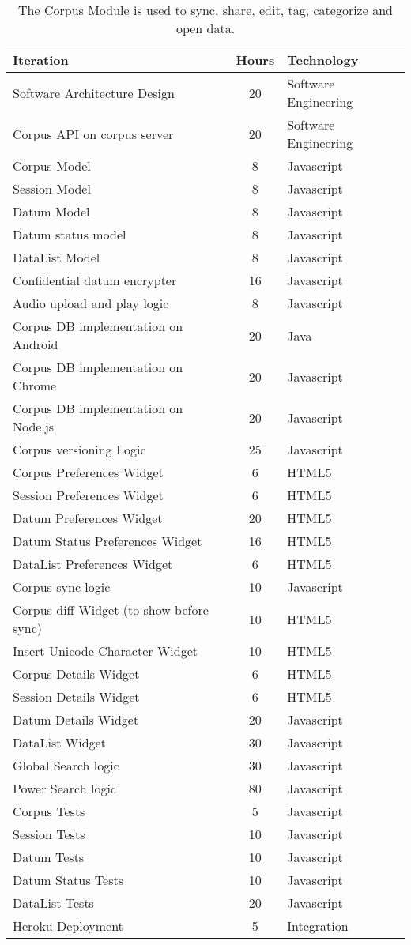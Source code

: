 \documentclass[12 pt]{article}
\begin{document}
\footnotesize
\begin{table}[htbp]
\begin{center}
  \begin{tabular}{ | lcl | }
\hline

Iteration&	Hours&	Technology	\\
\hline
Software Architecture Design&	20&	Software Engineering	\\ 
Corpus API on corpus server&	20&	Software Engineering\\ 
Corpus Model&	8&	Javascript	\\ 
Session Model&	8&	Javascript	\\ 
Datum Model&	8&	Javascript	\\ 
Datum status model&	8&	Javascript	\\ 
DataList Model&	8&	Javascript	\\ 
Confidential datum encrypter&	16&	Javascript	\\ 
Audio upload and play logic&	8&	Javascript	\\ 
Corpus DB  implementation on Android&	20&	Java	\\ 
Corpus DB  implementation on Chrome&	20&	Javascript	\\ 
Corpus DB  implementation on Node.js&	20&	Javascript \\ 
Corpus versioning Logic&	25&	Javascript	\\ 
Corpus Preferences Widget&	6&	HTML5	\\ 
Session Preferences Widget&	6&	HTML5	\\ 
Datum Preferences Widget&	20&	HTML5 \\ 
Datum Status Preferences Widget&	16&	HTML5	\\ 
DataList Preferences Widget&	6&  HTML5 \\ 
Corpus sync logic&	10&  Javascript \\ 
Corpus diff Widget (to show before sync)&	10&  HTML5 \\ 
Insert Unicode Character Widget&	10&  HTML5 \\ 
Corpus Details Widget&	6&  HTML5 \\
Session Details Widget&	6&  HTML5 \\  
Datum Details Widget&	20&  Javascript \\ 
DataList Widget&	30&  Javascript \\ 
Global Search logic&	30&  Javascript \\ 
Power Search logic&	80&  Javascript \\ 
Corpus Tests&	5&  Javascript \\ 
Session Tests&	10&  Javascript \\ 
Datum Tests&	10&  Javascript \\ 
Datum Status Tests&	10&  Javascript \\ 
DataList Tests&	20&  Javascript \\ 
Heroku Deployment&	5&  Integration \\ 
\hline
  \end{tabular}
 \caption{The Corpus Module is used to sync, share, edit, tag, categorize and open data. }
  \label{tab:label}
  \end{center}
\end{table}
\end{document}
